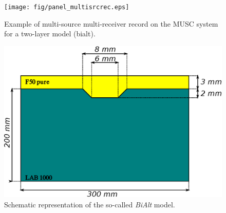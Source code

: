 \documentclass[manuscript,revised]{geophysics}
\begin{document}
\begin{figure}[!h]
	\centering
	\texttt{[image: fig/panel\_multisrcrec.eps]}
	\caption{Example of multi-source multi-receiver record on the MUSC system for a two-layer model (bialt).}
	\label{panel_multisrcrec}
\end{figure}

\begin{figure}[!h]
	\centering
	\includegraphics[scale=0.5]{fig/bialt_model.eps}
	\caption{Schematic representation of the so-called \textit{BiAlt} model.}
	\label{panel_bialt_model}
\end{figure}

\end{document}
